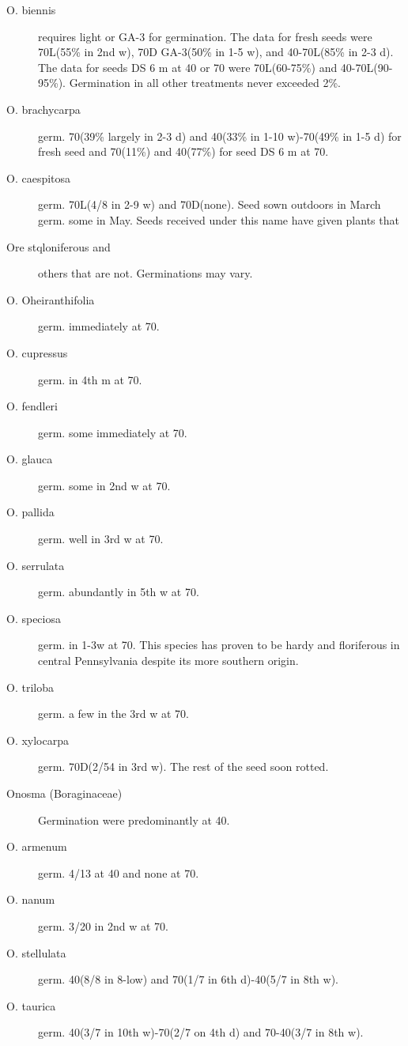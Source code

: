 \begin{description}
\item[O. biennis] requires light or GA-3 for germination. The data for fresh
seeds were 70L(55\% in 2nd w), 70D GA-3(50\% in 1-5 w), and 40-70L(85\% in 2-3
d). The data for seeds DS 6 m at 40 or 70 were 70L(60-75\%) and
40-70L(90-95\%). Germination in all other treatments never exceeded 2\%.
\item[O. brachycarpa] germ. 70(39\% largely in 2-3 d) and 40(33\% in 1-10
w)-70(49\% in 1-5 d) for fresh seed and 70(11\%) and 40(77\%) for seed DS 6 m
at 70.
\item[O. caespitosa] germ. 70L(4/8 in 2-9 w) and 70D(none). Seed sown outdoors
in March germ. some in May. Seeds received under this name have given plants
that
\item[Ore stqloniferous and] others that are not. Germinations may vary.
\item[O. Oheiranthifolia] germ. immediately at 70.
\item[O. cupressus] germ. in 4th m at 70.
\item[O. fendleri] germ. some immediately at 70.
\item[O. glauca] germ. some in 2nd w at 70.
\item[O. pallida] germ. well in 3rd w at 70.
\item[O. serrulata] germ. abundantly in 5th w at 70.
\item[O. speciosa] germ. in 1-3w at 70. This species has proven to be hardy
and floriferous in central Pennsylvania despite its more southern origin.
\item[O. triloba] germ. a few in the 3rd w at 70.
\item[O. xylocarpa] germ. 70D(2/54 in 3rd w). The rest of the seed soon rotted.

\item[Onosma (Boraginaceae)] Germination were predominantly at 40.
\item[O. armenum] germ. 4/13 at 40 and none at 70.
\item[O. nanum] germ. 3/20 in 2nd w at 70.
\item[O. stellulata] germ. 40(8/8 in 8-low) and 70(1/7 in 6th d)-40(5/7 in 8th w).
\item[O. taurica] germ. 40(3/7 in 10th w)-70(2/7 on 4th d) and 70-40(3/7 in 8th w).


\end{description}
